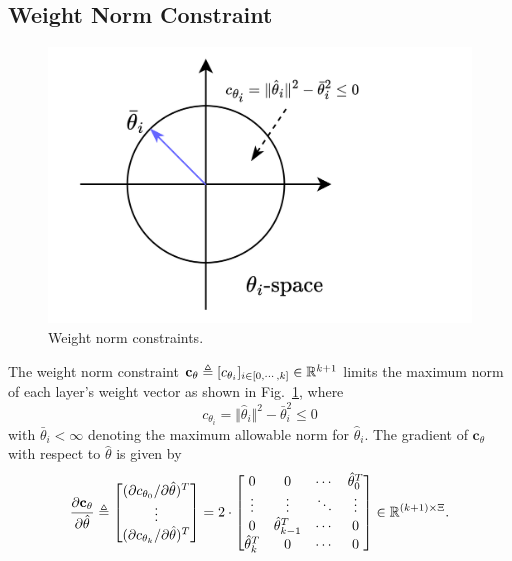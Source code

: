 \subsection{Weight Norm Constraint} \label{chap4:sec:weight_cstr}

\begin{figure}[t]
    \centering
    \includegraphics[width=0.5\linewidth]{imgs/cstr_weight.drawio.png}
    \caption{Weight norm constraints.}
    \label{chap4:fig:cstr:weight}
\end{figure}

The weight norm constraint $\mathbf{c}_{\theta}\triangleq [c_{\theta_i}]_{i\in[0,\cdots ,k]}\in\mathbb{R}^{k+1}$ limits the maximum norm of each layer's weight vector as shown in Fig.~\ref{chap4:fig:cstr:weight}, where
\begin{equation}
    c_{\theta_i}=\Vert \hat\theta_i\Vert^2 -\bar\theta_i^2 \le 0
    \label{chap4:eq:cstr:weight}
\end{equation}
with $\bar\theta_i<\infty$ denoting the maximum allowable norm for $\hat\theta_i$. 
The gradient of $\mathbf{c}_\theta$ with respect to $\hat\theta$ is given by
\begin{equation}
    {\partial \mathbf c_\theta \over \partial \hat\theta}
    \triangleq
    \begin{bmatrix}
        (\partial c_{\theta_0}/\partial \hat\theta)^T
        \\ 
        \vdots 
        \\
        (\partial c_{\theta_k}/\partial \hat\theta)^T
    \end{bmatrix}
    = 2\cdot 
    \begin{bmatrix}
        0&0&\cdots & \hat\theta_0^T\\
        \vdots&\vdots&\ddots&\vdots\\
        0&\hat\theta^T_{k-1}&\cdots &0\\
        \hat\theta^T_k&0&\cdots &0
    \end{bmatrix}
    \in\mathbb{R}^{(k+1)\times\Xi}
    .
    \label{chap4:eq:cstr:weight_grad}
\end{equation}

